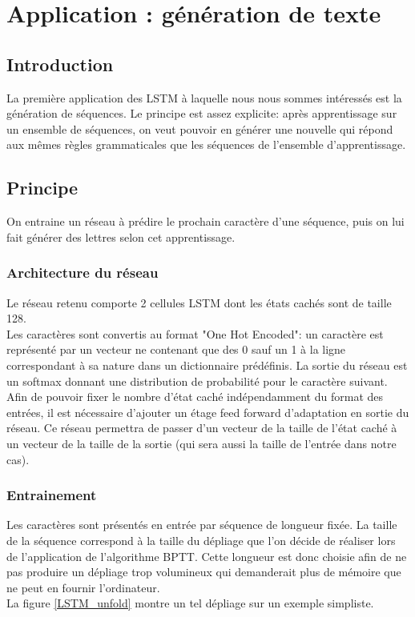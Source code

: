 \chapter{Application : génération de texte}

\label{chapter7}

\section{Introduction}

La première application des LSTM à laquelle nous nous sommes intéressés est la génération de séquences. Le principe est assez explicite: après apprentissage sur un ensemble de séquences, on veut pouvoir en générer une nouvelle qui répond aux mêmes règles grammaticales que les séquences de l'ensemble d'apprentissage.
 

\section{Principe}
On entraine un réseau à prédire le prochain caractère d'une séquence, puis on lui fait générer des lettres selon cet apprentissage.

\subsection{Architecture du réseau}

Le réseau retenu comporte 2 cellules LSTM dont les états cachés sont de taille 128.
\\ Les caractères sont convertis au format "One Hot Encoded": un caractère est représenté par un vecteur ne contenant que des 0 sauf un 1 à la ligne correspondant à sa nature dans un dictionnaire prédéfinis. La sortie du réseau est un softmax donnant une distribution de probabilité pour le caractère suivant.
\\ Afin de pouvoir fixer le nombre d'état caché indépendamment du format des entrées, il est nécessaire d'ajouter un étage feed forward d'adaptation en sortie du réseau. Ce réseau permettra de passer d'un vecteur de la taille de l'état caché à un vecteur de la taille de la sortie (qui sera aussi la taille de l'entrée dans notre cas).

\subsection{Entrainement}

Les caractères sont présentés en entrée par séquence de longueur fixée. La taille de la séquence correspond à la taille du dépliage que l'on décide de réaliser lors de l'application de l'algorithme BPTT. Cette longueur est donc choisie afin de ne pas produire un dépliage trop volumineux qui demanderait plus de mémoire que ne peut en fournir l'ordinateur.
\\ La figure \ref{LSTM_unfold} montre un tel dépliage sur un exemple simpliste.

